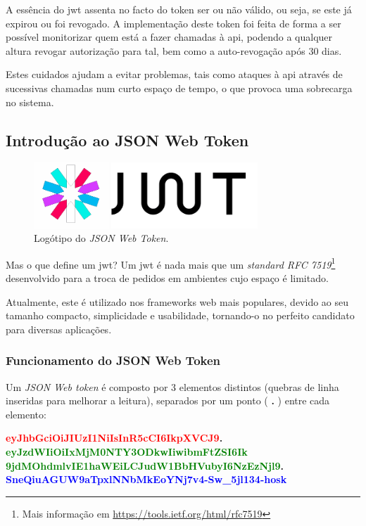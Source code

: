 A essência do \gls{jwt} assenta no facto do token ser ou não válido, ou seja, se este já expirou ou foi revogado. A implementação deste token foi feita de forma a ser possível monitorizar quem está a fazer chamadas à \gls{api}, podendo a qualquer altura revogar autorização para tal, bem como a auto-revogação após 30 dias.

Estes cuidados ajudam a evitar problemas, tais como ataques à \gls{api} através de sucessivas chamadas num curto espaço de tempo, o que provoca uma sobrecarga no sistema.

\subsection{Introdução ao JSON Web Token}

\begin{figure}[h]
    \centering
    \includegraphics[width=0.75\textwidth]{img/jwt/jwtlogo.png}
    \caption{Logótipo do \emph{JSON Web Token}. \cite{jwtLogo}}
\end{figure}

Mas o que define um \gls{jwt}? Um \gls{jwt} é nada mais que um \emph{standard RFC 7519}\cite{jones2015json}\cite{peyrott2016jwt}\footnote{Mais informação em \url{https://tools.ietf.org/html/rfc7519}} desenvolvido para a troca de pedidos em ambientes cujo espaço é limitado. 

Atualmente, este é utilizado nos frameworks web mais populares, devido ao seu tamanho compacto, simplicidade e usabilidade, tornando-o no perfeito candidato para diversas aplicações.

\cleardoublepage
\subsubsection{Funcionamento do JSON Web Token}

Um \emph{JSON Web token} é composto por 3 elementos distintos (quebras de linha inseridas para melhorar a leitura), separados por um ponto (\textbf{ . }) entre cada elemento:

\begin{center}
    \textbf{\textcolor{red}{eyJhbGciOiJIUzI1NiIsInR5cCI6IkpXVCJ9}.\\
    \textcolor{green}{eyJzdWIiOiIxMjM0NTY3ODkwIiwibmFtZSI6Ik\\9jdMOhdmlvIE1haWEiLCJudW1BbHVubyI6NzEzNjl9}.\\
    \textcolor{blue}{SneQiuAGUW9aTpxlNNbMkEoYNj7v4-Sw\_5jl134-hosk}}
\end{center}


